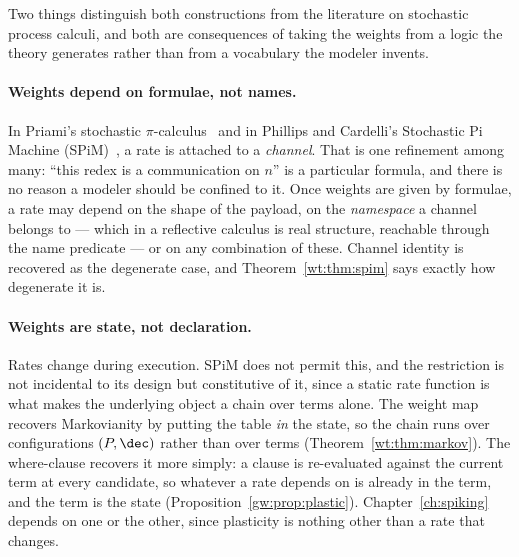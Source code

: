 Two things distinguish both constructions from the literature on stochastic process
calculi, and both are consequences of taking the weights from a logic the theory
generates rather than from a vocabulary the modeler invents.

\paragraph{Weights depend on formulae, not names.} In Priami's stochastic
$\pi$-calculus~\cite{priami} and in Phillips and Cardelli's Stochastic Pi Machine
(SPiM)~\cite{spim}, a rate is attached to a \emph{channel}. That is one refinement among
many: ``this redex is a communication on $n$'' is a particular formula, and there is no
reason a modeler should be confined to it. Once weights are given by formulae, a rate may
depend on the shape of the payload, on the \emph{namespace} a channel belongs to --- which
in a reflective calculus is real structure, reachable through the name predicate --- or
on any combination of these. Channel identity is recovered as the degenerate case, and
Theorem~\ref{wt:thm:spim} says exactly how degenerate it is.

\paragraph{Weights are state, not declaration.} Rates change during execution. SPiM does
not permit this, and the restriction is not incidental to its design but constitutive of
it, since a static rate function is what makes the underlying object a chain over terms
alone. The weight map recovers Markovianity by putting the table \emph{in} the state, so
the chain runs over configurations $(P,\dec)$ rather than over terms
(Theorem~\ref{wt:thm:markov}). The where-clause recovers it more simply: a clause is
re-evaluated against the current term at every candidate, so whatever a rate depends on
is already in the term, and the term is the state
(Proposition~\ref{gw:prop:plastic}). Chapter~\ref{ch:spiking} depends on one or the other,
since plasticity is nothing other than a rate that changes.


